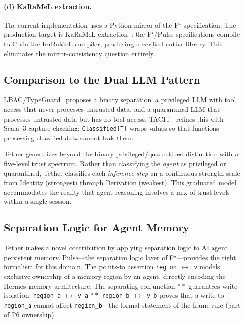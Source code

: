 \documentclass[sigplan,screen,nonacm]{acmart}
\newcommand{\fstar}{F\ensuremath{^\star}}
\newcommand{\pointsto}{\ensuremath{\mapsto}}
\newcommand{\sepconj}{\ensuremath{\mathbin{*\!*}}}
\begin{document}
\paragraph{(d) KaRaMeL extraction.}
The current implementation uses a Python mirror of the \fstar{}
specification. The production target is KaRaMeL
extraction~\cite{protzenko2017verified}: the \fstar{}/Pulse specifications
compile to C via the KaRaMeL compiler, producing a verified native library.
This eliminates the mirror-consistency question entirely.

\subsection{Comparison to the Dual LLM Pattern}

LBAC/TypeGuard~\cite{zhou2026lbac} proposes a binary separation: a
privileged LLM with tool access that never processes untrusted data, and a
quarantined LLM that processes untrusted data but has no tool access.
TACIT~\cite{odersky2026tacit} refines this with Scala~3 capture
checking: \texttt{Classified[T]} wraps values so that functions
processing classified data cannot leak them.

Tether generalizes beyond the binary privileged/quarantined
distinction with a five-level trust spectrum.
Rather than classifying the \emph{agent} as privileged or quarantined,
Tether classifies each \emph{inference step} on a continuous strength
scale from Identity (strongest) through Derivation (weakest).
This graduated model accommodates the reality that agent reasoning
involves a mix of trust levels within a single session.

\subsection{Separation Logic for Agent Memory}

Tether makes a novel contribution by applying separation logic to AI
agent persistent memory. Pulse---the separation logic layer of
\fstar{}---provides the right formalism for this domain. The points-to
assertion \texttt{region}~$\pointsto$~\texttt{v} models exclusive
ownership of a memory region by an agent, directly encoding the Hermes
memory architecture. The separating conjunction $\sepconj$ guarantees
write isolation: \texttt{region\_a}~$\pointsto$~\texttt{v\_a}
$\sepconj$ \texttt{region\_b}~$\pointsto$~\texttt{v\_b} proves that a
write to \texttt{region\_a} cannot affect \texttt{region\_b}---the
formal statement of the frame rule (part of P6 ownership).
\end{document}

